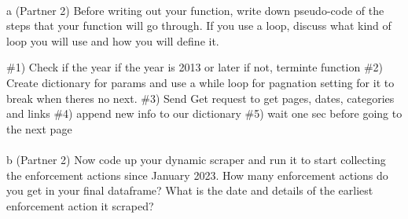 \documentclass[
  letterpaper,
  DIV=11,
  numbers=noendperiod]{scrartcl}
\makeatletter
\let\oldparagraph\paragraph
\renewcommand{\paragraph}{
    \@ifstar
      \xxxParagraphStar
      \xxxParagraphNoStar
  }
\newcommand{\xxxParagraphStar}[1]{\oldparagraph*{#1}\mbox{}}
\newcommand{\xxxParagraphNoStar}[1]{\oldparagraph{#1}\mbox{}}
\newenvironment{Shaded}{\begin{snugshade}}{\end{snugshade}}
\newcommand{\CommentTok}[1]{\textcolor[rgb]{0.37,0.37,0.37}{#1}}
\makeatother
\begin{document}
\paragraph{a (Partner 2) Before writing out your function, write down
pseudo-code of the steps that your function will go through. If you use
a loop, discuss what kind of loop you will use and how you will define
it.}\label{a-partner-2-before-writing-out-your-function-write-down-pseudo-code-of-the-steps-that-your-function-will-go-through.-if-you-use-a-loop-discuss-what-kind-of-loop-you-will-use-and-how-you-will-define-it.}

\begin{Shaded}
\begin{Highlighting}[]
\CommentTok{\#1) Check if the year if the year is 2013 or later if not, terminte function}
\CommentTok{\#2) Create dictionary for params and use a while loop for pagnation setting for it to break when there\textquotesingle{}s no next.}
\CommentTok{\#3) Send Get request to get pages, dates, categories and links}
\CommentTok{\#4) append new info to our dictionary}
\CommentTok{\#5) wait one sec before going to the next page}
\end{Highlighting}
\end{Shaded}

\paragraph{b (Partner 2) Now code up your dynamic scraper and run it to
start collecting the enforcement actions since January 2023. How many
enforcement actions do you get in your final dataframe? What is the date
and details of the earliest enforcement action it
scraped?}\label{b-partner-2-now-code-up-your-dynamic-scraper-and-run-it-to-start-collecting-the-enforcement-actions-since-january-2023.-how-many-enforcement-actions-do-you-get-in-your-final-dataframe-what-is-the-date-and-details-of-the-earliest-enforcement-action-it-scraped}
\end{document}
